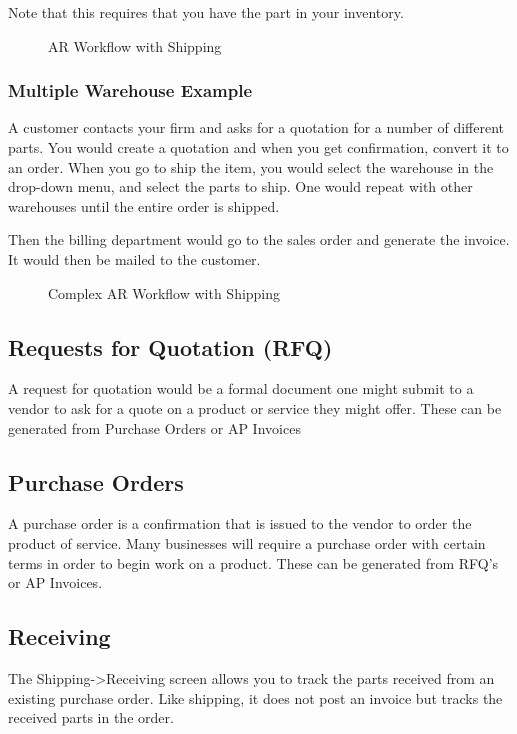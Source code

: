 \documentclass{article}
\begin{document}
Note that this requires that you have the part in your inventory.

\begin{figure}[hbtp]
\caption{AR Workflow with Shipping}

\end{figure}

\subsubsection{Multiple Warehouse Example}
A customer contacts your firm and asks for a quotation for a number of different
parts.  You would create a quotation and when you get confirmation, convert it
to an order.   When you go to ship the item, you would select the warehouse in
the drop-down menu, and select the parts to ship.  One would repeat with other
warehouses until the entire order is shipped.

Then the billing department would go to the sales order and generate the
invoice.  It would then be mailed to the customer.

\begin{figure}[hbtp]
\caption{Complex AR Workflow with Shipping}

\end{figure}

\subsection{Requests for Quotation (RFQ)}
A request for quotation would be a formal document one might submit to a vendor
to ask for a quote on a product or service they might offer.  These can be
generated from Purchase Orders or AP Invoices

\subsection{Purchase Orders}
A purchase order is a confirmation that is issued to the vendor to order the
product of service.  Many businesses will require a purchase order with certain
terms in order to begin work on a product.  These can be generated from RFQ's or
AP Invoices.

\subsection{Receiving}

The Shipping-\textgreater Receiving screen allows you to track the parts
received from an existing purchase order.  Like shipping, it does not post an
invoice but tracks the received parts in the order.
\end{document}
